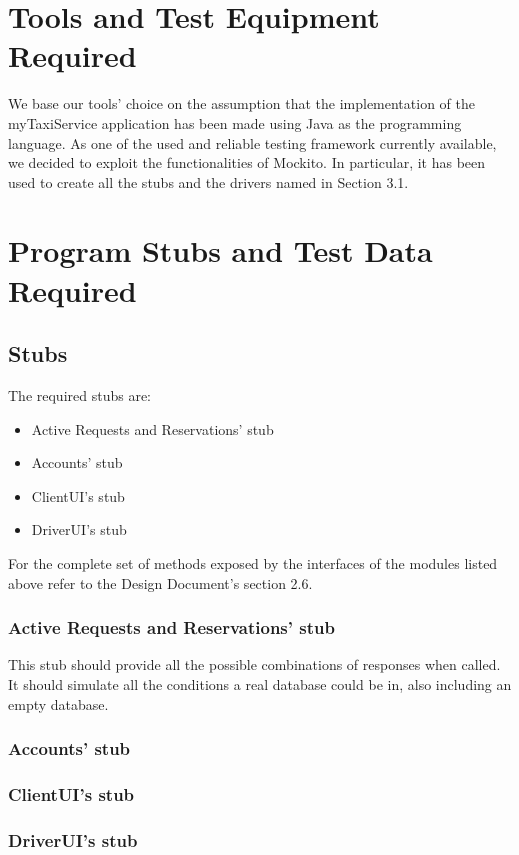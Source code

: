 \documentclass{article}
\begin{document}
\section{Tools and Test Equipment Required}
We base our tools' choice on the assumption that
the implementation of the myTaxiService application
has been made using Java as the programming language.
As one of the used and reliable testing framework
currently available, we decided to exploit the
functionalities of Mockito. In particular, it
has been used to create all the stubs and the drivers
named in Section 3.1.
\section{Program Stubs and Test Data Required}
\subsection{Stubs}
The required stubs are:
\begin{itemize}
	\item Active Requests and Reservations' stub
	\item Accounts' stub
	\item ClientUI's stub
	\item DriverUI's stub
\end{itemize}
For the complete set of methods exposed by the 
interfaces of the modules listed above refer
to the Design Document's section 2.6.
\subsubsection{Active Requests and Reservations' stub}
This stub should provide all the possible combinations
of responses when called. It should simulate all the
conditions a real database could be in, also including an
empty database.
\subsubsection{Accounts' stub}

\subsubsection{ClientUI's stub}

\subsubsection{DriverUI's stub}
\end{document}
